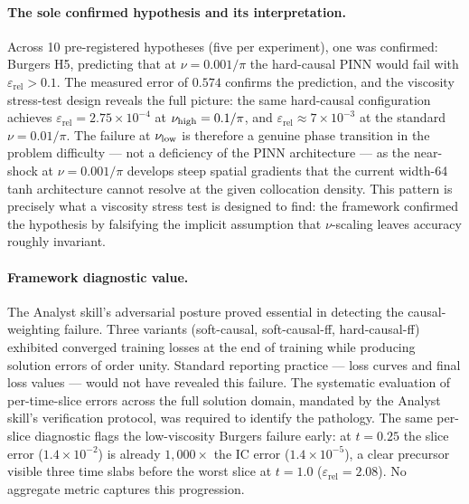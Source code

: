 \documentclass{article}
\newcommand{\relL}{\varepsilon_{\mathrm{rel}}}
\begin{document}
\paragraph{The sole confirmed hypothesis and its interpretation.}
Across 10 pre-registered hypotheses (five per experiment), one was confirmed:
Burgers H5, predicting that at $\nu=0.001/\pi$ the hard-causal PINN would
fail with $\relL > 0.1$.
The measured error of $0.574$ confirms the prediction, and the viscosity
stress-test design reveals the full picture: the same hard-causal configuration
achieves $\relL=2.75\times10^{-4}$ at $\nu_{\rm high}=0.1/\pi$, and
$\relL\approx7\times10^{-3}$ at the standard $\nu=0.01/\pi$.
The failure at $\nu_{\rm low}$ is therefore a genuine phase transition
in the problem difficulty — not a deficiency of the PINN architecture —
as the near-shock at $\nu=0.001/\pi$ develops steep spatial gradients that
the current width-64 tanh architecture cannot resolve at the given collocation
density.
This pattern is precisely what a viscosity stress test is designed to find:
the framework confirmed the hypothesis by falsifying the implicit assumption
that $\nu$-scaling leaves accuracy roughly invariant.

\paragraph{Framework diagnostic value.}
The Analyst skill's adversarial posture proved essential in detecting the
causal-weighting failure.
Three variants (soft-causal, soft-causal-ff, hard-causal-ff) exhibited
converged training losses at the end of training while producing solution
errors of order unity.
Standard reporting practice — loss curves and final loss values — would not
have revealed this failure.
The systematic evaluation of per-time-slice errors across the full solution
domain, mandated by the Analyst skill's verification protocol, was required
to identify the pathology.
The same per-slice diagnostic flags the low-viscosity Burgers failure
early: at $t=0.25$ the slice error ($1.4\times10^{-2}$) is already
$1{,}000\times$ the IC error ($1.4\times10^{-5}$), a clear precursor
visible three time slabs before the worst slice at $t=1.0$ ($\relL=2.08$).
No aggregate metric captures this progression.
\end{document}
